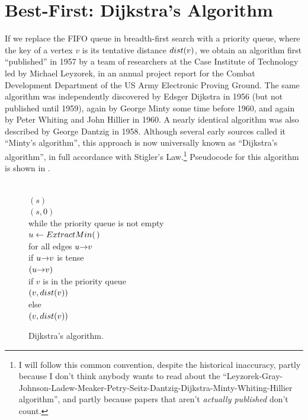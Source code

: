 \section{Best-First: Dijkstra’s Algorithm}
\label{sec:8.6}

If we replace the FIFO queue in breadth-first search with a priority queue, where the key of a vertex $v$ is its tentative distance $dist(v)$, we obtain an algorithm first “published” in 1957 by a team of researchers at the Case Institute of Technology led by Michael Leyzorek, in an annual project report for the Combat Development Department of the US Army Electronic Proving Ground.
The same algorithm was independently discovered by Edsger Dijkstra in 1956 (but not published until 1959), again by George Minty some time before 1960, and again by Peter Whiting and John Hillier in 1960.
A nearly identical algorithm was also described by George Dantzig in 1958.
Although several early sources called it “Minty’s algorithm”, this approach is now universally known as “Dijkstra’s algorithm”, in full accordance with Stigler’s Law.\footnote{I will follow this common convention, despite the historical inaccuracy, partly because I don’t think anybody wants to read about the “Leyzorek-Gray-Johnson-Ladew-Meaker-Petry-Seitz-Dantzig-Dijkstra-Minty-Whiting-Hillier algorithm”, and partly because papers that aren’t \textit{actually published} don’t count.}
Pseudocode for this algorithm is shown in .

\begin{figure}[ht]
\centering
\begin{pseudocode}
\\
$(s)$\\
$(s, 0)$\\
while the priority queue is not empty\\
\Indent $u \gets ExtractMin(\,)$\\
\Indent for all edges $u\mathord{\rightarrow}v$\\
\Indent\Indent if $u\mathord{\rightarrow}v$ is tense\\
\Indent\Indent\Indent {}$(u\mathord{\rightarrow}v)$\\
\Indent\Indent\Indent if $v$ is in the priority queue\\
\Indent\Indent\Indent\Indent {}$(v, dist(v))$\\
\Indent\Indent\Indent else\\
\Indent\Indent\Indent\Indent {}$(v, dist(v))$
\end{pseudocode}
\caption{Dijkstra’s algorithm.}
\label{fig:8.11}
\end{figure}

